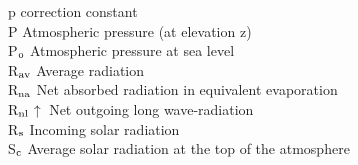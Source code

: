 \documentclass[11pt]{article}
\begin{document}
\begin{tabbing}
p\> \> correction constant\> \> \> \> \> \> \> \> [degrees]\\
P\> \> Atmospheric pressure (at elevation z)\> \> \> \> \> \> \> \> [kPa]\\
P$_{{\rm o}}$\> \> Atmospheric pressure at sea level\> \> \> \> \> \> \> \> [kPa]\\
R$_{{\rm av}}$\> \> Average radiation\> \> \> \> \> \> \> \> [J m$^{{\rm -2}}$ d$^{{\rm -1}}$]\\
R$_{{\rm na}}$\> \> Net absorbed radiation in equivalent evaporation\> \> \> \> \> \> \> \> [mm d$^{{\rm -1}}$]\\
R$_{{\rm nl}}$$\uparrow$\> \> Net outgoing long wave-radiation\> \> \> \> \> \> \> \> [J m$^{{\rm -2}}$ d$^{{\rm -1}}$]\\
R$_{{\rm s}}$\> \> Incoming solar radiation\> \> \> \> \> \> \> \> [J m$^{{\rm -2}}$ d$^{{\rm -1}}$]\\
S$_{{\rm c}}$\> \> Average solar radiation at the top of the atmosphere\> \> \> \> \> \> \> \> [J m$^{{\rm -2}}$ s$^{{\rm -1}}$]
\end{tabbing}
\end{document}
